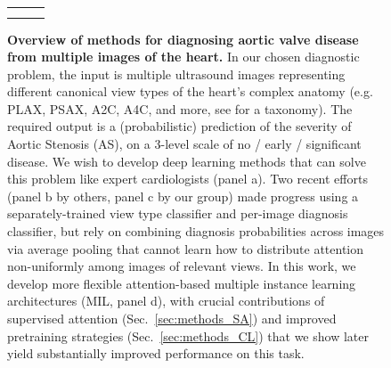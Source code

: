 \begin{figure}[!t]
\begin{tabular}{c c c}
\begin{minipage}{.45\textwidth}
(d) Attention-based MIL ~\\
\end{minipage}
\end{tabular}
\caption{\textbf{Overview of methods for diagnosing aortic valve disease from multiple images of the heart.}
In our chosen diagnostic problem, the input is multiple ultrasound images representing different canonical view types of the heart's complex anatomy (e.g. PLAX, PSAX, A2C, A4C, and more, see \citet{mitchell2019guidelines} for a taxonomy).
The required output is a (probabilistic) prediction of the severity of Aortic Stenosis (AS), on a 3-level scale of no / early / significant disease.
We wish to develop deep learning methods that can solve this problem like expert cardiologists (panel a).
Two recent efforts (panel b by others, panel c by our group) made progress using a separately-trained view type classifier and per-image diagnosis classifier, but rely on combining diagnosis probabilities across images via average pooling that cannot learn how to distribute attention non-uniformly among images of relevant views.
In this work, we develop more flexible attention-based multiple instance learning architectures (MIL, panel d), with crucial contributions of supervised attention (Sec.~\ref{sec:methods_SA}) and improved pretraining strategies (Sec.~\ref{sec:methods_CL}) that we show later yield substantially improved performance on this task.
}%
\label{fig:diagrams}
\end{figure}